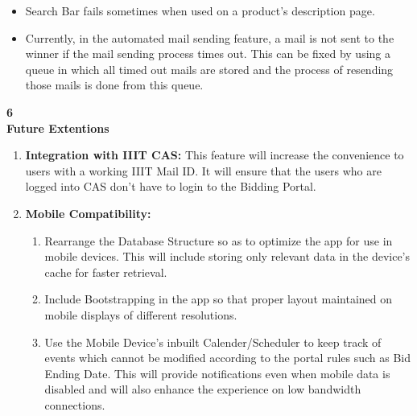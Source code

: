 \documentclass[a4paper,12pt]{article}
\begin{document}
{{\normalsize

\begin{itemize}
 \item Search Bar fails sometimes when used on a product's description page.
 \item Currently, in the automated mail sending feature, a mail is not sent to the winner if the mail sending process times out. This can be fixed by using a queue in which all timed out mails are stored and the process of resending those mails is done from this queue.
\end{itemize}

 
\huge{\textbf{6 \\ Future Extentions}} \vspace{12pt}

\normalsize
\begin{enumerate}

\item
\textbf{Integration with IIIT CAS:} This feature will increase the convenience to users with a working IIIT Mail ID. It will ensure that the users who are logged into CAS don't have to login to the Bidding Portal.
\item
\textbf{Mobile Compatibility:} 
\begin{enumerate}
\item Rearrange the Database Structure so as to optimize the app for use in mobile devices. This will include storing only relevant data in the device's cache for faster retrieval.
\item Include Bootstrapping in the app so that proper layout maintained on mobile displays of different resolutions.
\item Use the Mobile Device's inbuilt Calender/Scheduler to keep track of events which cannot be modified according to the portal rules such as Bid Ending Date. This will provide notifications even when mobile data is disabled and will also enhance the experience on low bandwidth connections.
\end{enumerate}


\end{enumerate}}}
\end{document}
